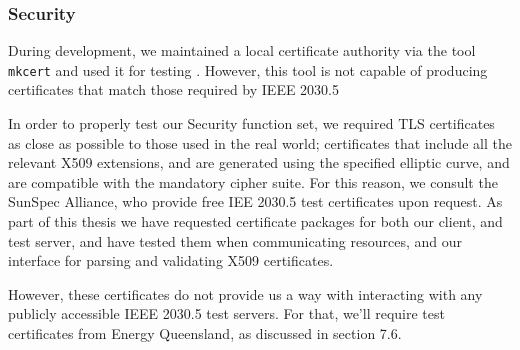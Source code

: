 \subsubsection{Security}
During development, we maintained a local certificate authority via the tool \texttt{mkcert} and used it for testing \cite{mkcert}. However, this tool is not capable of producing certificates that match those required by IEEE 2030.5

In order to properly test our Security function set, we required TLS certificates as close as possible to those used in the real world; certificates that include all the relevant X509 extensions, and are generated using the specified elliptic curve, and are compatible with the mandatory cipher suite. For this reason, we consult the SunSpec Alliance, who provide free IEE 2030.5 test certificates upon request. As part of this thesis we have requested certificate packages for both our client, and test server, and have tested them when communicating resources, and our interface for parsing and validating X509 certificates.

However, these certificates do not provide us a way with interacting with any publicly accessible IEEE 2030.5 test servers. For that, we'll require test certificates from Energy Queensland, as discussed in section 7.6.









